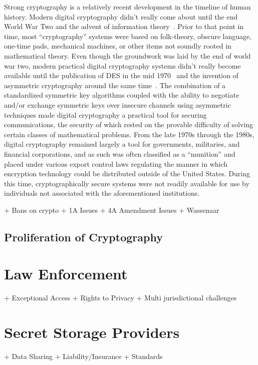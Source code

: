 Strong cryptography is a relatively recent development in the timeline
of human history. Modern digital cryptography didn't really come about
until the end World War Two and the advent of information
theory~\cite{shannon1945}. Prior to that point in time, most
``cryptography'' systems were based on folk-theory, obscure language,
one-time pads, mechanical machines, or other items not soundly rooted
in mathematical theory. Even though the groundwork was laid by the end
of world war two, modern practical digital cryptography systems didn't
really become available until the publication of DES in the mid
1970~\cite{fips46} and the invention of asymmetric cryptography around
the same time~\cite{diffie1976}. The combination of a standardized
symmetric key algorithms coupled with the ability to negotiate and/or
exchange symmetric keys over insecure channels using asymmetric
techniques made digital cryptography a practical tool for securing
communications, the security of which rested on the provable
difficulty of solving certain classes of mathematical problems. From
the late 1970s through the 1980s, digital cryptography remained
largely a tool for governments, militaries, and financial
corporations, and as such was often classified as a ``munition'' and
placed under various export control laws regulating the manner in
which encryption technology could be distributed outside of the United
States. During this time, cryptographically secure systems were not
readily available for use by individuals not associated with the
aforementioned institutions.

+ Bans on crypto
+ 1A Issues
+ 4A Amendment Issues
+ Wassenaar

\subsection{Proliferation of Cryptography}
\label{chap:policy:crypto:proliferation}


\section{Law Enforcement}
\label{chap:policy:leo}

+ Exceptional Access
+ Rights to Privacy
+ Multi jurisdictional challenges

\section{Secret Storage Providers}
\label{chap:policy:ssp}

+ Data Sharing
+ Liability/Insurance
+ Standards

